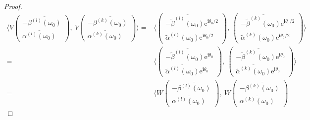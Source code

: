\documentclass[pdflatex,sn-mathphys-num]{sn-jnl}%
\theoremstyle{thmstyleone}%
\theoremstyle{thmstyletwo}%
\theoremstyle{thmstylethree}%
\theoremstyle{definition}
\theoremstyle{remark}
\begin{document}
\begin{proof}
    \begin{equation*}
    \begin{aligned}
     \langle V
    \begin{pmatrix}
    -\overline{\beta^{(l)}(\omega_0)} \\
    \overline{\alpha^{(l)}(\omega_0)}
    \end{pmatrix},\
    V
   \begin{pmatrix}
   	-\overline{\beta^{(k)}(\omega_0)} \\
   	\overline{\alpha^{(k)}(\omega_0)}
   \end{pmatrix}
    \rangle
    = &      \langle
    \begin{pmatrix}
    	-\overline{\widetilde{\beta}^{(l)}(\omega_0)}\mathrm{e}^{\boldsymbol{i}\theta_0/2} \\
    	\overline{\widetilde{\alpha}^{(l)}(\omega_0)}\mathrm{e}^{\boldsymbol{i}\theta_0/2}
    \end{pmatrix},\
      \begin{pmatrix}
     	-\overline{\widetilde{\beta}^{(k)}(\omega_0)}\mathrm{e}^{\boldsymbol{i}\theta_0/2} \\
     	\overline{\widetilde{\alpha}^{(k)}(\omega_0)}\mathrm{e}^{\boldsymbol{i}\theta_0/2}
     \end{pmatrix}
    \rangle \\
    = &
    \langle
    \begin{pmatrix}
    	-\overline{\widetilde{\beta}^{(l)}(\omega_0)}\mathrm{e}^{\boldsymbol{i}\theta_0} \\
    	\overline{\widetilde{\alpha}^{(l)}(\omega_0)}\mathrm{e}^{\boldsymbol{i}\theta_0}
    \end{pmatrix},\
    \begin{pmatrix}
    	-\overline{\widetilde{\beta}^{(k)}(\omega_0)}\mathrm{e}^{\boldsymbol{i}\theta_0} \\
    	\overline{\widetilde{\alpha}^{(k)}(\omega_0)}\mathrm{e}^{\boldsymbol{i}\theta_0}
    \end{pmatrix}
    \rangle \\
    = & \langle W
    \begin{pmatrix}
    	-\overline{\beta^{(l)}(\omega_0)} \\
    	\overline{\alpha^{(l)}(\omega_0)}
    \end{pmatrix},\
    W
    \begin{pmatrix}
    	-\overline{\beta^{(k)}(\omega_0)} \\
    	\overline{\alpha^{(k)}(\omega_0)}
    \end{pmatrix}

\end{aligned}
\end{equation*}
\end{proof}
\end{document}
